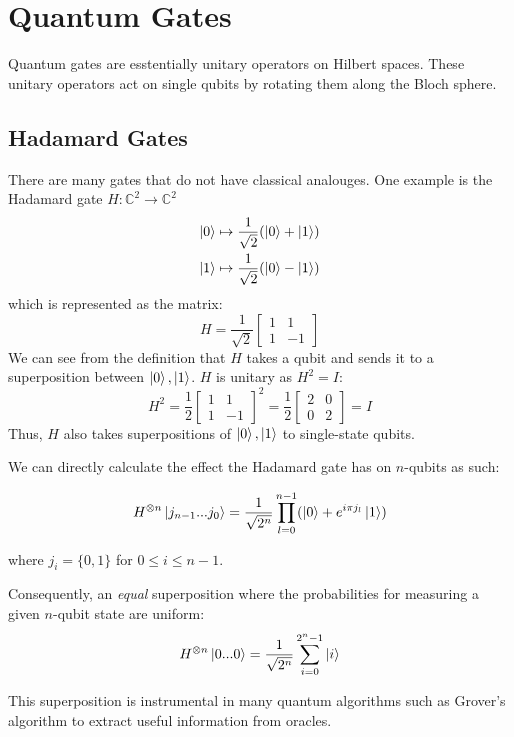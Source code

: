 \documentclass[quantum.tex]{subfiles}
\begin{document}
\section{Quantum Gates}

Quantum gates are esstentially unitary operators on Hilbert spaces. These unitary operators act on single qubits by rotating them along the Bloch sphere.

\subsection{Hadamard Gates}
There are many gates that do not have classical analouges. One example is the Hadamard gate $H: \mathbb{C}^2 \rightarrow \mathbb{C}^2$
\begin{gather*}
  \ket{0} \mapsto \frac{1}{\sqrt{2}}(\ket{0} + \ket{1}) \\
  \ket{1} \mapsto \frac{1}{\sqrt{2}}(\ket{0} - \ket{1})
\end{gather*}
which is represented as the matrix:
$$ H =  \frac{1}{\sqrt{2}} \begin{bmatrix} 1 & 1 \\ 1 & -1 \end{bmatrix} $$
We can see from the definition that $H$ takes a qubit and sends it to a superposition between $\ket{0},\ket{1}$. $H$ is unitary as $H^2 = I$:
$$H^2 = \frac{1}{2} \begin{bmatrix} 1 & 1 \\ 1 & -1 \end{bmatrix}^2 = \frac{1}{2}\begin{bmatrix} 2 & 0 \\ 0 & 2 \end{bmatrix} = I $$
Thus, $H$ also takes superpositions of $\ket{0},\ket{1}$ to single-state qubits.

We can directly calculate the effect the Hadamard gate has on $n$-qubits as such:

$$ H^{\otimes n} \ket{j_{n-1}...j_0} = \frac{1}{\sqrt{2^n}}\prod_{l=0}^{n-1} (\ket{0} + e^{i\pi j_l}\ket{1}) $$

where $j_i = \{0,1\}$ for $0 \leq i \leq n-1$.

Consequently, an \textit{equal} superposition where the probabilities for measuring a given $n$-qubit state are uniform:
$$H^{\otimes n}\ket{0...0} = \frac{1}{\sqrt{2^n}}\sum_{i=0}^{2^n-1}\ket{i}$$

This superposition is instrumental in many quantum algorithms such as Grover's algorithm to extract useful information from oracles.
\end{document}
